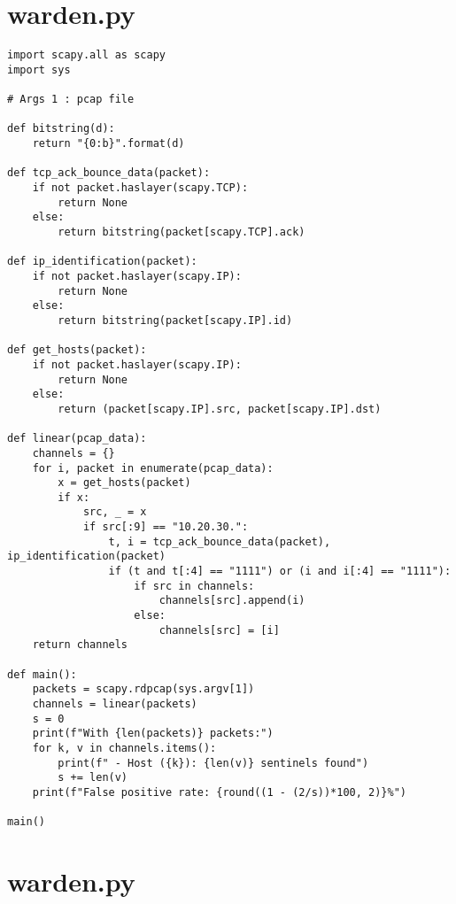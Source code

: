 \section{warden.py}
\label{sec:warden_py}

\begin{listing}[H]
    \vspace{0.5cm}
    \begin{verbatim}
import scapy.all as scapy
import sys

# Args 1 : pcap file

def bitstring(d):
    return "{0:b}".format(d)

def tcp_ack_bounce_data(packet):
    if not packet.haslayer(scapy.TCP):
        return None
    else:
        return bitstring(packet[scapy.TCP].ack)

def ip_identification(packet):
    if not packet.haslayer(scapy.IP):
        return None
    else:
        return bitstring(packet[scapy.IP].id)

def get_hosts(packet):
    if not packet.haslayer(scapy.IP):
        return None
    else:
        return (packet[scapy.IP].src, packet[scapy.IP].dst)

def linear(pcap_data):
    channels = {}
    for i, packet in enumerate(pcap_data):
        x = get_hosts(packet)
        if x:
            src, _ = x
            if src[:9] == "10.20.30.":
                t, i = tcp_ack_bounce_data(packet), ip_identification(packet)
                if (t and t[:4] == "1111") or (i and i[:4] == "1111"):
                    if src in channels:
                        channels[src].append(i)
                    else:
                        channels[src] = [i]
    return channels

def main():
    packets = scapy.rdpcap(sys.argv[1])
    channels = linear(packets)
    s = 0
    print(f"With {len(packets)} packets:")
    for k, v in channels.items():
        print(f" - Host ({k}): {len(v)} sentinels found")
        s += len(v)
    print(f"False positive rate: {round((1 - (2/s))*100, 2)}%")

main()
    \end{verbatim}
\end{listing}

\section{warden.py}
\label{sec:warden_py}

